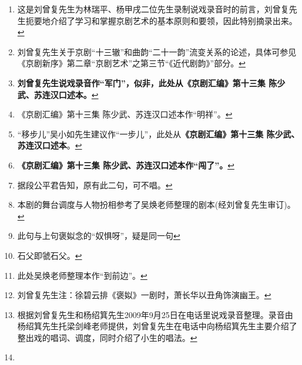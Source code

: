 \begin{enumerate}
\item
  \leavevmode\hypertarget{fn1}{}%
  这是刘曾复先生为林瑞平、杨甲戌二位先生录制说戏录音时的前言，刘曾复先生扼要地介绍了学习和掌握京剧艺术的基本原则和要领，因此特别摘录出来。\protect\hyperlink{fnref1}{↩}
\item
  \leavevmode\hypertarget{fn2}{}%
  刘曾复先生关于京剧``十三辙''和曲韵``二十一韵''流变关系的论述，具体可参见《京剧新序》第二章``京剧艺术''之第三节``《近代剧韵》''部分。\protect\hyperlink{fnref2}{↩}
\item
  \leavevmode\hypertarget{fn3}{}%
  \textbf{刘曾复先生说戏录音作``军门''，似非，此处从《京剧汇编》第十三集
  陈少武、苏连汉口述本。}\protect\hyperlink{fnref3}{↩}
\item
  \leavevmode\hypertarget{fn4}{}%
  《京剧汇编》第十三集
  陈少武、苏连汉口述本作``明祥''。\protect\hyperlink{fnref4}{↩}
\item
  \leavevmode\hypertarget{fn5}{}%
  ``移步儿''吴小如先生建议作``一步儿''，此处从\textbf{《京剧汇编》第十三集
  陈少武、苏连汉口述本}。\protect\hyperlink{fnref5}{↩}
\item
  \leavevmode\hypertarget{fn6}{}%
  \textbf{《京剧汇编》第十三集
  陈少武、苏连汉口述本作``闯了''。}\protect\hyperlink{fnref6}{↩}
\item
  \leavevmode\hypertarget{fn7}{}%
  据段公平君告知，原有此二句，可不唱。\protect\hyperlink{fnref7}{↩}
\item
  \leavevmode\hypertarget{fn8}{}%
  本剧的舞台调度与人物扮相参考了吴焕老师整理的剧本(经刘曾复先生审订)。\protect\hyperlink{fnref8}{↩}
\item
  \leavevmode\hypertarget{fn9}{}%
  此句与上句褒姒念的``奴惧呀''，疑是同一句\protect\hyperlink{fnref9}{↩}
\item
  \leavevmode\hypertarget{fn10}{}%
  石父即虢石父。\protect\hyperlink{fnref10}{↩}
\item
  \leavevmode\hypertarget{fn11}{}%
  此处吴焕老师整理本作``到前边''。\protect\hyperlink{fnref11}{↩}
\item
  \leavevmode\hypertarget{fn12}{}%
  刘曾复先生注：徐碧云排《褒姒》一剧时，萧长华以丑角饰演幽王。\protect\hyperlink{fnref12}{↩}
\item
  \leavevmode\hypertarget{fn13}{}%
  根据刘曾复先生和杨绍箕先生2009年9月25日在电话里说戏录音整理。录音由杨绍箕先生托梁剑峰老师提供，刘曾复先生在电话中向杨绍箕先生主要介绍了整出戏的唱词、调度，同时介绍了小生的唱法。\protect\hyperlink{fnref13}{↩}
\item
  \leavevmode\hypertarget{fn14}{}%

\end{enumerate}

